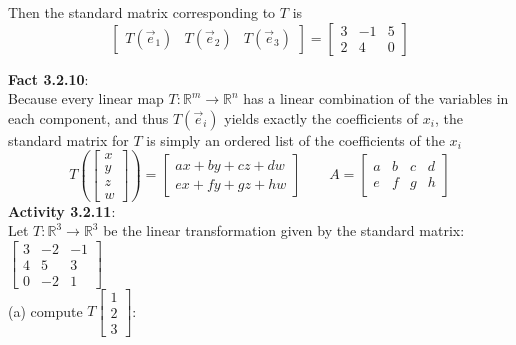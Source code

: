 \documentclass{article}
\begin{document}
Then the standard matrix corresponding to $T$ is\\
\begin{equation*}
\left[\begin{array}{ccc}T(\vec e_1) & T(\vec e_2) & T(\vec e_3)\end{array}\right]
=
\left[\begin{array}{ccc}3 & -1 & 5 \\ 2 & 4 & 0 \end{array}\right]
\end{equation*}

\noindent \textbf{Fact 3.2.10}:\\
Because every linear map $T \colon \mathbb{R}^{m} \rightarrow \mathbb{R}^{n}$ has a linear combination of the variables in each component, and thus $T(\vec{e}_{i})$ yields exactly the coefficients of $x_{i}$, the standard matrix for $T$ is simply an ordered list of the coefficients of the $x_{i}$\\
\begin{equation*}
T\left(\left[\begin{array}{c}x\\y\\z\\w\end{array}\right]\right)
=
\left[\begin{array}{c}
ax+by+cz+dw \\
ex+fy+gz+hw
\end{array}\right]
\hspace{2em}
A
=
\left[\begin{array}{cccc}
a & b & c & d \\
e & f & g & h
\end{array}\right]
\end{equation*}
\newpage
\noindent \textbf{Activity 3.2.11}:\\
Let  $T: \mathbb{R}^3 \rightarrow \mathbb{R}^3$ be the linear transformation given by the standard matrix:\\
$\begin{bmatrix} 3 & -2 & -1 \\ 4 & 5 & 3 \\ 0 & -2 & 1 \end{bmatrix}$\\
(a) compute $T\begin{bmatrix} 1 \\ 2 \\3 \end{bmatrix}$: \\
\end{document}
